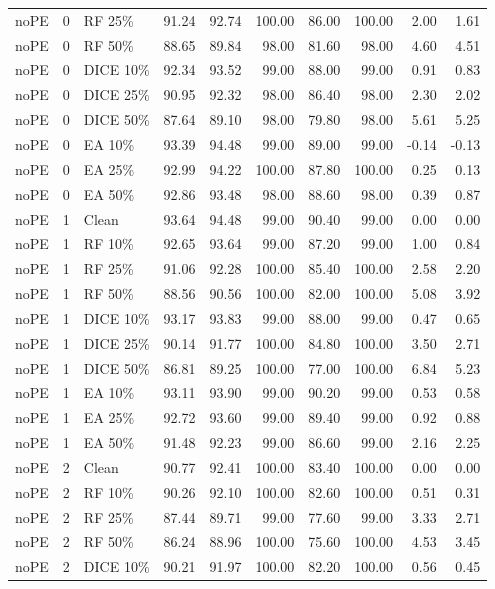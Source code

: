 {\begin{longtable}{rllrrrrrrr}
noPE & 0 & RF 25\% & 91.24 & 92.74 & 100.00 & 86.00 & 100.00 & 2.00 & 1.61 \\
noPE & 0 & RF 50\% & 88.65 & 89.84 & 98.00 & 81.60 & 98.00 & 4.60 & 4.51 \\
noPE & 0 & DICE 10\% & 92.34 & 93.52 & 99.00 & 88.00 & 99.00 & 0.91 & 0.83 \\
noPE & 0 & DICE 25\% & 90.95 & 92.32 & 98.00 & 86.40 & 98.00 & 2.30 & 2.02 \\
noPE & 0 & DICE 50\% & 87.64 & 89.10 & 98.00 & 79.80 & 98.00 & 5.61 & 5.25 \\
noPE & 0 & EA 10\% & 93.39 & 94.48 & 99.00 & 89.00 & 99.00 & -0.14 & -0.13 \\
noPE & 0 & EA 25\% & 92.99 & 94.22 & 100.00 & 87.80 & 100.00 & 0.25 & 0.13 \\
noPE & 0 & EA 50\% & 92.86 & 93.48 & 98.00 & 88.60 & 98.00 & 0.39 & 0.87 \\
noPE & 1 & Clean & 93.64 & 94.48 & 99.00 & 90.40 & 99.00 & 0.00 & 0.00 \\
noPE & 1 & RF 10\% & 92.65 & 93.64 & 99.00 & 87.20 & 99.00 & 1.00 & 0.84 \\
noPE & 1 & RF 25\% & 91.06 & 92.28 & 100.00 & 85.40 & 100.00 & 2.58 & 2.20 \\
noPE & 1 & RF 50\% & 88.56 & 90.56 & 100.00 & 82.00 & 100.00 & 5.08 & 3.92 \\
noPE & 1 & DICE 10\% & 93.17 & 93.83 & 99.00 & 88.00 & 99.00 & 0.47 & 0.65 \\
noPE & 1 & DICE 25\% & 90.14 & 91.77 & 100.00 & 84.80 & 100.00 & 3.50 & 2.71 \\
noPE & 1 & DICE 50\% & 86.81 & 89.25 & 100.00 & 77.00 & 100.00 & 6.84 & 5.23 \\
noPE & 1 & EA 10\% & 93.11 & 93.90 & 99.00 & 90.20 & 99.00 & 0.53 & 0.58 \\
noPE & 1 & EA 25\% & 92.72 & 93.60 & 99.00 & 89.40 & 99.00 & 0.92 & 0.88 \\
noPE & 1 & EA 50\% & 91.48 & 92.23 & 99.00 & 86.60 & 99.00 & 2.16 & 2.25 \\
noPE & 2 & Clean & 90.77 & 92.41 & 100.00 & 83.40 & 100.00 & 0.00 & 0.00 \\
noPE & 2 & RF 10\% & 90.26 & 92.10 & 100.00 & 82.60 & 100.00 & 0.51 & 0.31 \\
noPE & 2 & RF 25\% & 87.44 & 89.71 & 99.00 & 77.60 & 99.00 & 3.33 & 2.71 \\
noPE & 2 & RF 50\% & 86.24 & 88.96 & 100.00 & 75.60 & 100.00 & 4.53 & 3.45 \\
noPE & 2 & DICE 10\% & 90.21 & 91.97 & 100.00 & 82.20 & 100.00 & 0.56 & 0.45 \\

\end{longtable}}
